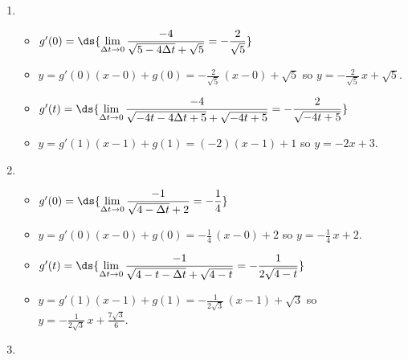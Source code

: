 \documentclass{ximera}
\begin{document}
\begin{enumerate}
\setcounter{enumi}{\value{HW}}

\item \begin{itemize}

\item  $g'(0) = \ds{ \lim_{\Delta t \rightarrow 0} \dfrac{-4}{\sqrt{5-4\Delta t} + \sqrt{5}}  = - \dfrac{2}{\sqrt{5}}}$

\smallskip

\item  $y = g'(0) (x - 0) + g(0) =  -\frac{2}{\sqrt{5}} \, (x-0) + \sqrt{5}$ so $y = -\frac{2}{\sqrt{5}} \, x + \sqrt{5}$.

\smallskip

\item  $g'(t) =  \ds{ \lim_{\Delta t \rightarrow 0} \dfrac{-4}{\sqrt{-4t-4\Delta t+5} + \sqrt{-4t+5}} =   -\dfrac{2}{\sqrt{-4t+5}}}$

\smallskip

\item  $y = g'(1)(x-1)+g(1) = (-2)(x-1) + 1$ so $y = -2x+3$.

\smallskip

\end{itemize}

\item   \begin{itemize}

\item  $g'(0) = \ds{ \lim_{\Delta t \rightarrow 0} \dfrac{-1}{\sqrt{4-\Delta t} + 2}  = - \dfrac{1}{4}}$

\smallskip

\item  $y = g'(0) (x - 0) + g(0) =  -\frac{1}{4} \, (x-0) + 2$ so $y = -\frac{1}{4} \, x +2$.

\smallskip

\item  $g'(t) = \ds{ \lim_{\Delta t \rightarrow 0} \dfrac{-1}{\sqrt{4-t-\Delta t} + \sqrt{4-t}} = -\dfrac{1}{2 \sqrt{4-t}} }$  

\smallskip

\item  $y = g'(1)(x-1)+g(1) = -\frac{1}{2 \sqrt{3}} \, (x-1) + \sqrt{3}$ so $y =  -\frac{1}{2 \sqrt{3}}  \, x + \frac{7 \sqrt{3}}{6}$.

\smallskip

\end{itemize}


\item   \begin{enumerate}


\end{enumerate}
\end{enumerate}
\end{document}
